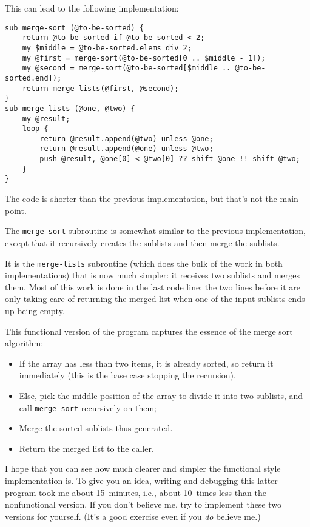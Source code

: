 This can lead to the following implementation:

\begin{verbatim}
sub merge-sort (@to-be-sorted) {
    return @to-be-sorted if @to-be-sorted < 2;
    my $middle = @to-be-sorted.elems div 2;
    my @first = merge-sort(@to-be-sorted[0 .. $middle - 1]);
    my @second = merge-sort(@to-be-sorted[$middle .. @to-be-sorted.end]);
    return merge-lists(@first, @second);
}
sub merge-lists (@one, @two) {
    my @result;
    loop {
        return @result.append(@two) unless @one;
        return @result.append(@one) unless @two;
        push @result, @one[0] < @two[0] ?? shift @one !! shift @two;
    }
} 
\end{verbatim}

The code is shorter than the previous implementation, but 
that's not the main point.

The {\tt merge-sort} subroutine is somewhat similar to 
the previous implementation, except that it recursively 
creates the sublists and then merge the sublists.

It is the {\tt merge-lists} subroutine (which does the bulk 
of the work in both implementations) that is now much 
simpler: it receives two sublists and merges them. Most of this 
work is done in the last code line; the two lines before it 
are only taking care of returning the merged list when one 
of the input sublists ends up being empty.

This functional version of the program captures  
the essence of the merge sort algorithm:
\begin{itemize}
\item If the  array has less than two items, it is already 
sorted, so return it immediately (this is the base case 
stopping the recursion).
\item Else, pick the middle position of the array to divide 
it into two sublists, and call \verb'merge-sort' recursively 
on them;
\item Merge the sorted sublists thus generated.
\item Return the merged list to the caller.
\end{itemize}

I hope that you can see how much clearer and simpler the 
functional style implementation is. To give you an idea, 
writing and debugging this latter program took me about 
15~minutes, i.e., about 10~times less than the 
nonfunctional version. If you don't believe me, try to 
implement these two versions for yourself. (It's a good 
exercise even if you \emph{do} believe me.)

